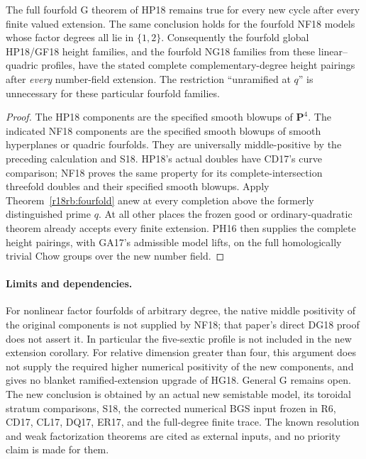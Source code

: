 \begin{corollary}
\label{r18rb:families}
The full fourfold G theorem of HP18 remains true for every new cycle
after every finite valued extension.  The same conclusion holds for
the fourfold NF18 models whose factor degrees all lie in $\{1,2\}$.
Consequently the fourfold global HP18/GF18 height families, and the
fourfold NG18 families from these linear--quadric profiles, have the
stated complete complementary-degree height pairings after
\emph{every} number-field extension.  The restriction ``unramified
at $q$'' is unnecessary for these particular fourfold families.
\end{corollary}

\begin{proof}
The HP18 components are the specified smooth blowups of
$\mathbf P^4$.  The indicated NF18 components are the specified
smooth blowups of smooth hyperplanes or quadric fourfolds.
They are universally middle-positive by the preceding calculation
and S18.  HP18's actual doubles have CD17's curve comparison;
NF18 proves the same property for its complete-intersection
threefold doubles and their specified smooth blowups.  Apply
Theorem~\ref{r18rb:fourfold} anew at every completion above the
formerly distinguished prime $q$.  At all other places the frozen
good or ordinary-quadratic theorem already accepts every finite
extension.  PH16 then supplies the complete height pairings, with
GA17's admissible model lifts, on the full homologically trivial
Chow groups over the new number field.
\end{proof}

\paragraph{Limits and dependencies.}
For nonlinear factor fourfolds of arbitrary degree, the native middle
positivity of the original components is not supplied by NF18; that
paper's direct DG18 proof does not assert it.  In particular the
five-sextic profile is not included in the new extension corollary.
For relative dimension greater than four, this argument does not
supply the required higher numerical positivity of the new
components, and gives no blanket ramified-extension upgrade of
HG18.  General G remains open.  The new conclusion is obtained by
an actual new semistable model, its toroidal stratum comparisons,
S18, the corrected numerical BGS input frozen in R6, CD17, CL17,
DQ17, ER17, and the full-degree finite trace.  The known resolution
and weak factorization theorems are cited as external inputs, and
no priority claim is made for them.
